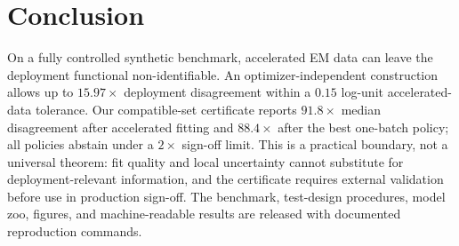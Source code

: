\documentclass{article}
\begin{document}
\section{Conclusion}

On a fully controlled synthetic benchmark, accelerated EM data can leave the
deployment functional non-identifiable. An optimizer-independent construction
allows up to $15.97\times$ deployment disagreement within a $0.15$ log-unit
accelerated-data tolerance. Our compatible-set certificate reports $91.8\times$
median disagreement after accelerated fitting and $88.4\times$ after the
best one-batch policy; all policies abstain under a $2\times$ sign-off limit.
This is a practical boundary, not a universal theorem: fit quality and local
uncertainty cannot substitute for deployment-relevant information, and the
certificate requires external validation before use in production sign-off.
The benchmark, test-design procedures, model zoo, figures, and machine-readable
results are released with documented reproduction commands.
\end{document}
